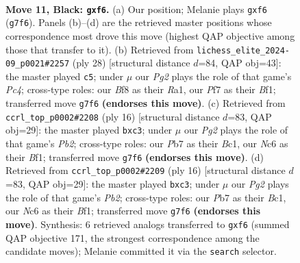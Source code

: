 \documentclass[11pt]{article}
\begin{document}
\clearpage

\begin{figure}[p]\centering
\begin{subfigure}{0.46\textwidth}\centering
\resizebox{\linewidth}{!}{%
\newchessgame
\chessboard[
  setfen={r1b1kb1r/pp3ppp/2n2B2/4p3/3pN3/3P4/PqPQ1PPP/2R1K1NR b Kkq - 1 11},
  showmover=false,
  pgfstyle=straightmove, color=movearrow, markmove={g7-f6}
]}
\caption{}
\end{subfigure}\hfill
\begin{subfigure}{0.46\textwidth}\centering
\resizebox{\linewidth}{!}{%
\newchessgame
\chessboard[
  setfen={rn1q1k1r/5ppp/b7/p2p4/QpPPn3/4PN2/PB3PPP/R3KB1R w KQ - 4 15},
  showmover=false,
  pgfstyle=straightmove, color=movearrow, markmove={c4-c5}
]}
\caption{}
\end{subfigure}
\\[4pt]
\begin{subfigure}{0.46\textwidth}\centering
\resizebox{\linewidth}{!}{%
\newchessgame
\chessboard[
  setfen={rnbqk2r/pp3ppp/2p5/3p4/3Pn3/P1b1PN2/1PQ2PPP/R1B1KB1R w KQkq - 0 9},
  showmover=false,
  pgfstyle=straightmove, color=movearrow, markmove={b2-c3}
]}
\caption{}
\end{subfigure}\hfill
\begin{subfigure}{0.46\textwidth}\centering
\resizebox{\linewidth}{!}{%
\newchessgame
\chessboard[
  setfen={rnbqk2r/pp3ppp/2p5/3p4/3Pn3/P1b1PN2/1PQ2PPP/R1B1KB1R w KQkq - 0 9},
  showmover=false,
  pgfstyle=straightmove, color=movearrow, markmove={b2-c3}
]}
\caption{}
\end{subfigure}
\caption{\textbf{Move 11, Black: \texttt{gxf6}.} (a) Our position; Melanie plays \texttt{gxf6} (\texttt{g7f6}). Panels (b)--(d) are the retrieved master positions whose correspondence most drove this move (highest QAP objective among those that transfer to it). (b) Retrieved from \texttt{lichess\_elite\_2024-09\_p0021\#2257} (ply 28) [structural distance $d$=84, QAP obj=43]: the master played \texttt{c5}; under $\mu$ our \emph{Pg2} plays the role of that game's \emph{Pc4}; cross-type roles: our \emph{B}f8 as their \emph{R}a1, our \emph{P}f7 as their \emph{B}f1; transferred move \texttt{g7f6} \textbf{(endorses this move)}. (c) Retrieved from \texttt{ccrl\_top\_p0002\#2208} (ply 16) [structural distance $d$=83, QAP obj=29]: the master played \texttt{bxc3}; under $\mu$ our \emph{Pg2} plays the role of that game's \emph{Pb2}; cross-type roles: our \emph{P}b7 as their \emph{B}c1, our \emph{N}c6 as their \emph{B}f1; transferred move \texttt{g7f6} \textbf{(endorses this move)}. (d) Retrieved from \texttt{ccrl\_top\_p0002\#2209} (ply 16) [structural distance $d$=83, QAP obj=29]: the master played \texttt{bxc3}; under $\mu$ our \emph{Pg2} plays the role of that game's \emph{Pb2}; cross-type roles: our \emph{P}b7 as their \emph{B}c1, our \emph{N}c6 as their \emph{B}f1; transferred move \texttt{g7f6} \textbf{(endorses this move)}. Synthesis: 6 retrieved analogs transferred to \texttt{gxf6} (summed QAP objective 171, the strongest correspondence among the candidate moves); Melanie committed it via the \texttt{search} selector.}
\label{fig:thought-m21}
\end{figure}
\end{document}
